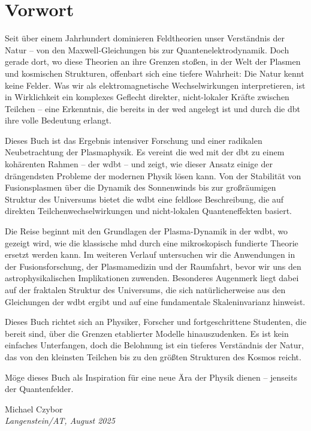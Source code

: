 \documentclass[11pt, a5paper, twoside, openright]{book}
\begin{document}
\chapter*{Vorwort}
Seit über einem Jahrhundert dominieren Feldtheorien unser Verständnis der Natur – von den Maxwell-Gleichungen bis zur Quantenelektrodynamik. Doch gerade dort, wo diese Theorien an
ihre Grenzen stoßen, in der Welt der Plasmen und kosmischen Strukturen, offenbart sich eine tiefere Wahrheit: Die Natur kennt keine Felder. Was wir als elektromagnetische
Wechselwirkungen interpretieren, ist in Wirklichkeit ein komplexes Geflecht direkter, nicht-lokaler Kräfte zwischen Teilchen – eine Erkenntnis, die bereits in der \gls{wed} angelegt
ist und durch die \gls{dbt} ihre volle Bedeutung erlangt.

Dieses Buch ist das Ergebnis intensiver Forschung und einer radikalen Neubetrachtung der Plasmaphysik. Es vereint die \gls{wed} mit der \gls{dbt} zu einem kohärenten
Rahmen – der \gls{wdbt} – und zeigt, wie dieser Ansatz einige der drängendsten Probleme der modernen Physik lösen kann. Von der Stabilität von Fusionsplasmen über die Dynamik
des Sonnenwinds bis zur großräumigen Struktur des Universums bietet die \gls{wdbt} eine feldlose Beschreibung, die auf direkten Teilchenwechselwirkungen und nicht-lokalen
Quanteneffekten basiert.

Die Reise beginnt mit den Grundlagen der Plasma-Dynamik in der \gls{wdbt}, wo gezeigt wird, wie die klassische \gls{mhd} durch eine mikroskopisch fundierte Theorie ersetzt werden
kann. Im weiteren Verlauf untersuchen wir die Anwendungen in der Fusionsforschung, der Plasmamedizin und der Raumfahrt, bevor wir uns den astrophysikalischen Implikationen zuwenden.
Besonderes Augenmerk liegt dabei auf der fraktalen Struktur des Universums, die sich natürlicherweise aus den Gleichungen der \gls{wdbt} ergibt und auf eine fundamentale
Skaleninvarianz hinweist.

Dieses Buch richtet sich an Physiker, Forscher und fortgeschrittene Studenten, die bereit sind, über die Grenzen etablierter Modelle hinauszudenken. Es ist kein einfaches
Unterfangen, doch die Belohnung ist ein tieferes Verständnis der Natur, das von den kleinsten Teilchen bis zu den größten Strukturen des Kosmos reicht.

Möge dieses Buch als Inspiration für eine neue Ära der Physik dienen – jenseits der Quantenfelder.

\begin{flushright}
    Michael Czybor \\
    \emph{Langenstein/AT, August 2025}
\end{flushright}

\tableofcontents
\listoffigures
\listoftables

\mainmatter






%
%

\backmatter
\printbibliography[title=Literaturverzeichnis]
\glswritefiles
\printglossary[title=Glossar]
\printglossary[type=acronym, title=Abkürzungen]
\end{document}
